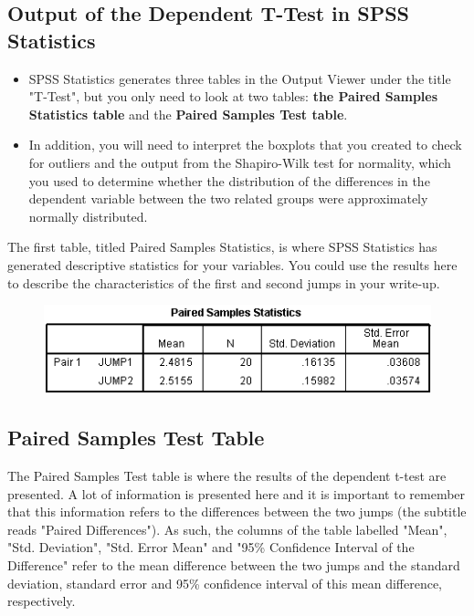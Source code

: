 \documentclass[]{article}
\begin{document}
\newpage
\subsection{Output of the Dependent T-Test in SPSS Statistics}
\begin{itemize}
	\item SPSS Statistics generates three tables in the Output Viewer under the title "T-Test", but you only need to look at two tables: \textbf{the Paired Samples Statistics table} and the \textbf{Paired Samples Test table}.\smallskip
	\item In addition, you will need to interpret the boxplots that you created to check for outliers and the output from the Shapiro-Wilk test for normality, which you used to determine whether the distribution of the differences in the dependent variable between the two related groups were approximately normally distributed. \smallskip
\end{itemize}

	


	The first table, titled Paired Samples Statistics, is where SPSS Statistics has generated descriptive statistics for your variables. You could use the results here to describe the characteristics of the first and second jumps in your write-up.
	
\begin{figure}[h!]
\centering
\includegraphics[width=0.7\linewidth]{Paired/PairedOutput1}

\label{fig:PairedOutput1}
\end{figure}

	
\subsection{Paired Samples Test Table}
	The Paired Samples Test table is where the results of the dependent t-test are presented. A lot of information is presented here and it is important to remember that this information refers to the differences between the two jumps (the subtitle reads "Paired Differences"). As such, the columns of the table labelled "Mean", "Std. Deviation", "Std. Error Mean" and "95\% Confidence Interval of the Difference" refer to the mean difference between the two jumps and the standard deviation, standard error and 95\% confidence interval of this mean difference, respectively. 
	
\end{document}
